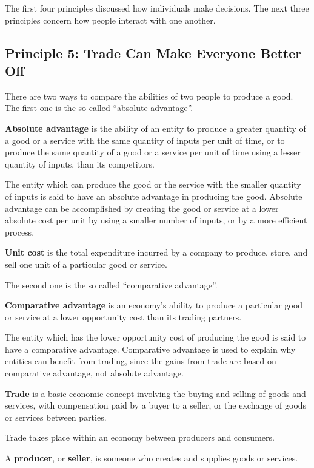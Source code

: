 The first four principles discussed how individuals make decisions. The next three principles concern how people
interact with one another.

\subsection*{Principle 5: Trade Can Make Everyone Better Off}

There are two ways to compare the abilities of two people to produce a good. The first one is the so called ``absolute
advantage''.

\textbf{Absolute advantage} is the ability of an entity to produce a greater quantity of a good or a service with the
same quantity of inputs per unit of time, or to produce the same quantity of a good or a service per unit of time using
a lesser quantity of inputs, than its competitors.
\ed

The entity which can produce the good or the service with the smaller quantity of inputs is said to have an absolute
advantage in producing the good. Absolute advantage can be accomplished by creating the good or service at a lower
absolute cost per unit by using a smaller number of inputs, or by a more efficient process.

\textbf{Unit cost} is the total expenditure incurred by a company to produce, store, and sell one unit of a particular
good or service.
\ed

The second one is the so called ``comparative advantage''.

\textbf{Comparative advantage} is an economy's ability to produce a particular good or service at a lower opportunity
cost than its trading partners.
\ed

The entity which has the lower opportunity cost of producing the good is said to have a comparative advantage.
Comparative advantage is used to explain why entities can benefit from trading, since the gains from trade are based on
comparative advantage, not absolute advantage.

\bd[Trade]
\textbf{Trade} is a basic economic concept involving the buying and selling of goods and services, with compensation
paid by a buyer to a seller, or the exchange of goods or services between parties.
\ed

Trade takes place within an economy between producers and consumers.

A \textbf{producer}, or \textbf{seller}, is someone who creates and supplies goods or services.
\ed

